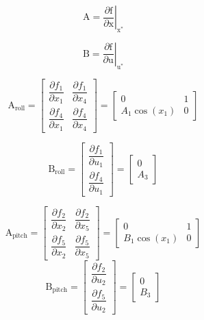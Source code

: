 \documentclass[conference]{IEEEtran}
\begin{document}
\begin{equation}
	\boldsymbol{\mathrm{A}} = \left.\dfrac{\partial \boldsymbol{\mathrm{f}}}{\partial \boldsymbol{\mathrm{x}}}\right\vert_{\boldsymbol{\mathrm{x}^*}}
\end{equation}

\begin{equation}
	\boldsymbol{\mathrm{B}} = \left.\dfrac{\partial \boldsymbol{\mathrm{f}}}{\partial \boldsymbol{\mathrm{u}}}\right\vert_{\boldsymbol{\mathrm{u}^*}}
\end{equation}

\begin{equation}
	\boldsymbol{\mathrm{A}}_{\text{roll}} = \begin{bmatrix}
		\dfrac{\partial  f_1}{\partial  x_1}& \dfrac{\partial  f_1}{\partial  x_4}
		\\[1em]
		\dfrac{\partial  f_4}{\partial  x_1}& \dfrac{\partial  f_4}{\partial  x_4}
	\end{bmatrix} = 
	\begin{bmatrix}
		0 & 1\\
		A_1\cos(x_1) & 0
	\end{bmatrix}
\end{equation}

\begin{equation}
	\boldsymbol{\mathrm{B}}_{\text{roll}}  = \begin{bmatrix}
		\dfrac{\partial  f_1}{\partial  u_1}
		\\[1em]
		\dfrac{\partial  f_4}{\partial  u_1}
	\end{bmatrix} = 
	\begin{bmatrix}
		0\\
		A_3
	\end{bmatrix}
\end{equation}

\begin{equation}
	\boldsymbol{\mathrm{A}}_{\text{pitch}}  = \begin{bmatrix}
		\dfrac{\partial  f_2}{\partial  x_2}& \dfrac{\partial  f_2}{\partial  x_5}
		\\[1em]
		\dfrac{\partial  f_5}{\partial  x_2}& \dfrac{\partial  f_5}{\partial  x_5}
	\end{bmatrix} = 
	\begin{bmatrix}
		0 & 1\\
		B_1\cos(x_1) & 0
	\end{bmatrix}
\end{equation}
\begin{equation}
	\boldsymbol{\mathrm{B}}_{\text{pitch}}  = \begin{bmatrix}
		\dfrac{\partial  f_2}{\partial  u_2}
		\\[1em]
		\dfrac{\partial  f_5}{\partial  u_2}
	\end{bmatrix} = 
	\begin{bmatrix}
		0\\
		B_3
	\end{bmatrix}
\end{equation}
\end{document}
